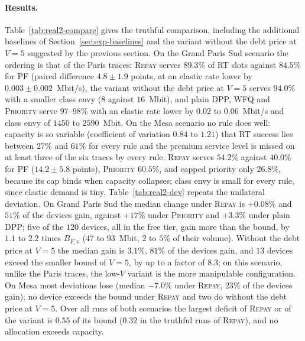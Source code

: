 \documentclass[preprint,11pt]{elsarticle}
\theoremstyle{definition}
\theoremstyle{remark}
\newcommand{\repay}{\textsc{Repay}}
\begin{document}
\paragraph{Results.}
Table~\ref{tab:real2-compare} gives the truthful comparison, including the additional baselines of Section~\ref{sec:exp-baselines} and the variant without the debt price at $V=5$ suggested by the previous section.
On the Grand Paris Sud scenario the ordering is that of the Paris traces: \repay{} serves $89.3\%$ of RT slots against $84.5\%$ for \textsc{PF} (paired difference $4.8\pm1.9$ points, at an elastic rate lower by $0.003\pm0.002$~Mbit/s), the variant without the debt price at $V=5$ serves $94.0\%$ with a smaller class envy ($8$ against $16$~Mbit), and plain DPP, \textsc{WFQ} and \textsc{Priority} serve $97$--$98\%$ with an elastic rate lower by $0.02$ to $0.06$~Mbit/s and class envy of $1450$ to $2590$~Mbit.
On the Mesa scenario no rule does well: capacity is so variable (coefficient of variation $0.84$ to $1.21$) that RT success lies between $27\%$ and $61\%$ for every rule and the premium service level is missed on at least three of the six traces by every rule. \repay{} serves $54.2\%$ against $40.0\%$ for \textsc{PF} ($14.2\pm5.8$ points), \textsc{Priority} $60.5\%$, and capped priority only $26.8\%$, because its cap binds when capacity collapses; class envy is small for every rule, since elastic demand is tiny.
Table~\ref{tab:real2-dev} repeats the unilateral deviation.
On Grand Paris Sud the median change under \repay{} is $+0.08\%$ and $51\%$ of the devices gain, against $+17\%$ under \textsc{Priority} and $+3.3\%$ under plain DPP; five of the $120$ devices, all in the free tier, gain more than the bound, by $1.1$ to $2.2$ times $B_{F,\mathrm{v}}$ ($47$ to $93$~Mbit, $2$ to $5\%$ of their volume).
Without the debt price at $V=5$ the median gain is $3.1\%$, $81\%$ of the devices gain, and $13$ devices exceed the smaller bound of $V=5$, by up to a factor of $8.3$; on this scenario, unlike the Paris traces, the low-$V$ variant is the more manipulable configuration.
On Mesa most deviations lose (median $-7.0\%$ under \repay{}, $23\%$ of the devices gain); no device exceeds the bound under \repay{} and two do without the debt price at $V=5$.
Over all runs of both scenarios the largest deficit of \repay{} or of the variant is $0.55$ of its bound ($0.32$ in the truthful runs of \repay{}), and no allocation exceeds capacity.
\end{document}
